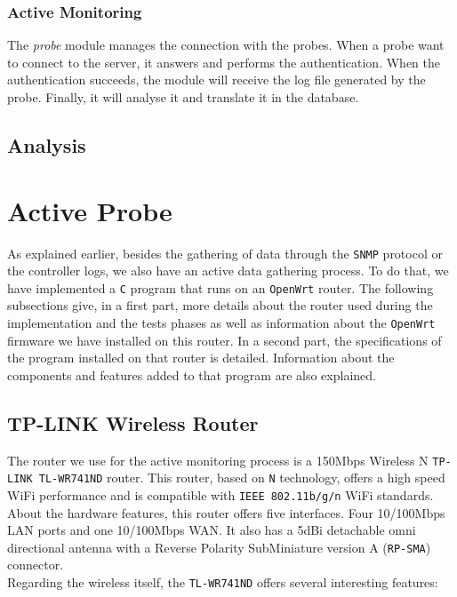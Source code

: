 \subsubsection{Active Monitoring}
The \emph{probe} module manages the connection with the probes. When a probe want to connect to the server, it answers and performs the authentication. When the authentication succeeds, the module will receive the log file generated by the probe. Finally, it will analyse it and translate it in the database.

\subsection{Analysis}


\section{Active Probe}
As explained earlier, besides the gathering of data through the \texttt{SNMP} protocol or the controller logs, we also have an active data gathering process. To do that, we have implemented a \texttt{C} program that runs on an \texttt{OpenWrt} router. The following subsections give, in a first part, more details about the router used during the implementation and the tests phases as well as information about the \texttt{OpenWrt} firmware we have installed on this router. In a second part, the specifications of the program installed on that router is detailed. Information about the components and features added to that program are also explained.\\


\subsection{TP-LINK Wireless Router}
The router we use for the active monitoring process is a 150Mbps Wireless N \texttt{TP-LINK TL-WR741ND} router. This router, based on \texttt{N} technology, offers a high speed WiFi performance and is compatible with \texttt{IEEE 802.11b/g/n} WiFi standards. \\
About the hardware features, this router offers five interfaces. Four 10/100Mbps LAN ports and one 10/100Mbps WAN. It also has a 5dBi detachable omni directional antenna with a Reverse Polarity SubMiniature version A (\texttt{RP-SMA}) connector.\\
Regarding the wireless itself, the \texttt{TL-WR741ND} offers several interesting features\cite{tplink}:

